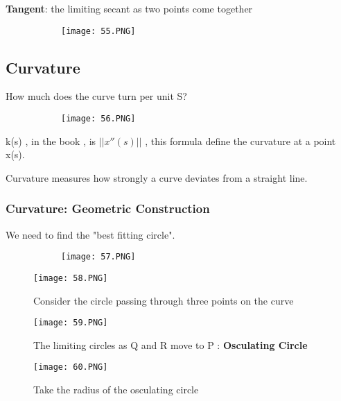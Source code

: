\documentclass{article}
\begin{document}
\textbf{Tangent}: the limiting secant as two points come together

    \begin{figure}[ht!]
  \centering
  \begin{subfigure}[b]{0.4\linewidth}
    \texttt{[image: 55.PNG]}
  \end{subfigure}
\end{figure}

\subsection{Curvature}

How much does the curve turn per unit S?

    \begin{figure}[ht!]
  \centering
  \begin{subfigure}[b]{0.5\linewidth}
    \texttt{[image: 56.PNG]}
  \end{subfigure}
\end{figure}

k(s) , in the book , is $||x''(s)||$ , this formula define the curvature at a point x(s).

Curvature measures how strongly a curve deviates from a straight line.

\subsubsection{Curvature: Geometric Construction}

We need to find the "best fitting circle".

    \begin{figure}[ht!]
  \centering
  \begin{subfigure}[b]{0.4\linewidth}
    \texttt{[image: 57.PNG]}
  \end{subfigure}
\end{figure}

\begin{figure}[!htb]
  \texttt{[image: 58.PNG]}
  \caption{Consider the circle passing through three points on the curve}
  
\endminipage\hfill
{}
  \texttt{[image: 59.PNG]}
  \caption{The limiting circles as Q and R move to P : \textbf{Osculating Circle}}
  
\endminipage\hfill
{}%
  \texttt{[image: 60.PNG]}
  \caption{Take the radius of the osculating circle}
  
\endminipage
\end{figure}
\end{document}
